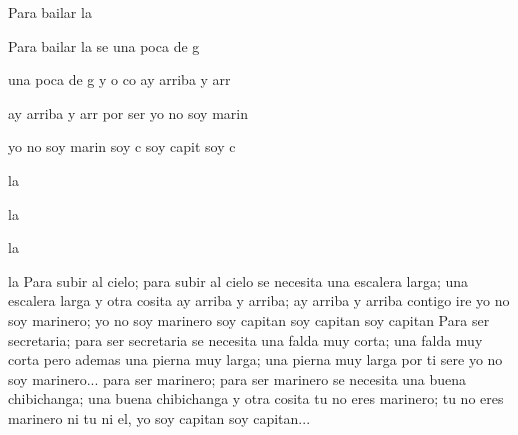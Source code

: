 
\zs

Para bailar la  

Para bailar la  se  una poca de g 

una poca de g y o co ay arriba y arr  

ay arriba y arr por  ser yo no soy marin  

yo no soy marin soy c soy capit soy c
\ks
\zr

 la 

 la 

 la 

 la 
\kr
\zs
Para subir al cielo;
para subir al cielo se necesita una escalera larga;
una escalera larga y otra cosita ay arriba y arriba;
ay arriba y arriba contigo ire yo no soy marinero;
yo no soy marinero soy capitan soy capitan soy capitan
\ks
\zr    \kr
\zs
Para ser secretaria;
para ser secretaria se necesita una falda muy corta;
una falda muy corta pero ademas una pierna muy larga;
una pierna muy larga por ti sere yo no soy marinero...
\ks
\zs
para ser marinero;
para ser marinero se necesita una buena chibichanga;
una buena chibichanga y otra cosita tu no eres marinero;
tu no eres marinero ni tu ni el, yo soy capitan soy capitan...
\ks
\kp


